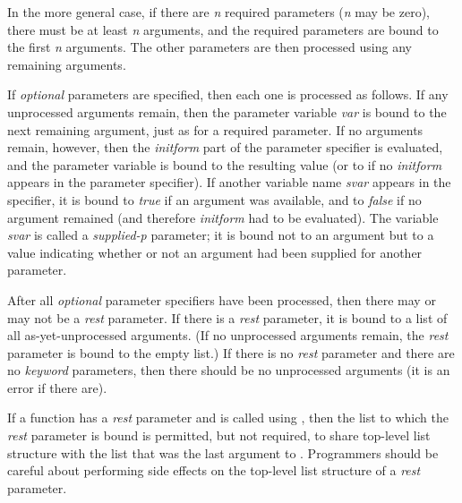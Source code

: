 In the more general case, if there are \emph{n} required parameters
(\emph{n} may be zero), there must be at least \emph{n} arguments,
and the required parameters are bound to the first \emph{n} arguments.
The other parameters are then processed using any remaining arguments.

If \emph{optional} parameters are specified, then each one is processed as
follows.  If any unprocessed arguments remain, then the parameter variable
\emph{var} is bound to the next remaining argument, just as for a required
parameter.  If no arguments remain, however, then the \emph{initform} part
of the parameter specifier is evaluated, and the parameter variable
is bound to the resulting value (or to {\false} if no \emph{initform} appears
in the parameter specifier).
If another variable name \emph{svar} appears in the specifier, it is bound
to \emph{true} if an argument was available, and to \emph{false} if no
argument remained (and therefore \emph{initform} had to be evaluated).
The variable \emph{svar} is called a \emph{supplied-p} parameter;
it is bound not to an argument but to a value indicating whether or not
an argument had been supplied for another parameter.

After all \emph{optional} parameter specifiers have been processed,
then there may or may not be a \emph{rest} parameter.
If there is a \emph{rest} parameter, it is bound to a list of all
as-yet-unprocessed arguments.  (If no unprocessed arguments remain,
the \emph{rest} parameter is bound to the empty list.)
If there is no \emph{rest} parameter and there are no \emph{keyword}
parameters,
then there should be no unprocessed arguments (it is an error if there are).

If a function has a \emph{rest} parameter
and is called using , then the list to which the
\emph{rest} parameter is bound is permitted, but not required,
to share top-level list structure with the list that was the last
argument to .  Programmers should be careful about performing
side effects on the top-level list structure of a \emph{rest} parameter.

